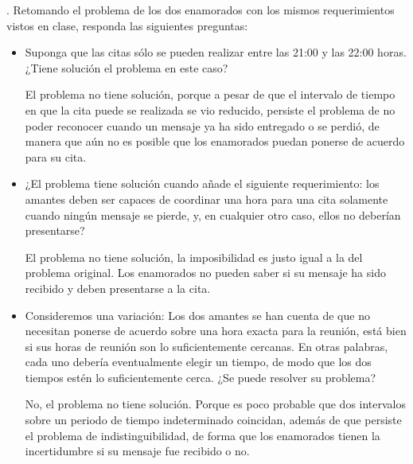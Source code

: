 . Retomando el problema de los dos enamorados con
los mismos requerimientos vistos en clase, responda
las siguientes preguntas:

\begin{itemize}
\item Suponga que las citas sólo se pueden realizar
  entre las 21:00 y las 22:00 horas. ¿Tiene solución
  el problema en este caso?
  
  El problema no tiene solución, porque a pesar de que el intervalo de tiempo en que la cita puede se realizada se vio reducido, persiste el problema de no poder reconocer cuando un mensaje ya ha sido entregado o se perdió, de manera que aún no es posible que los enamorados puedan ponerse de acuerdo para su cita.

\item ¿El problema tiene solución cuando añade el siguiente
  requerimiento: los amantes deben ser capaces de coordinar
  una hora para una cita solamente cuando ningún mensaje
  se pierde, y, en cualquier otro caso, ellos no deberían
  presentarse?
  
 El problema no tiene solución, la imposibilidad es justo igual a la del problema original. Los enamorados no pueden saber si su mensaje ha sido recibido y deben presentarse a la cita.  

\item Consideremos una variación: Los dos amantes se han
  cuenta de que no necesitan ponerse de acuerdo sobre una
  hora exacta para la reunión, está bien si sus horas de
  reunión son lo suficientemente cercanas. En otras palabras,
  cada uno debería eventualmente elegir un tiempo, de modo
  que los dos tiempos estén lo suficientemente cerca. ¿Se
  puede resolver su problema?
  
  No, el problema no tiene solución. Porque es poco probable que dos intervalos sobre un periodo de tiempo indeterminado coincidan, además de que persiste el problema de indistinguibilidad, de forma que los enamorados tienen la incertidumbre si su mensaje fue recibido o no.
  
\end{itemize}
